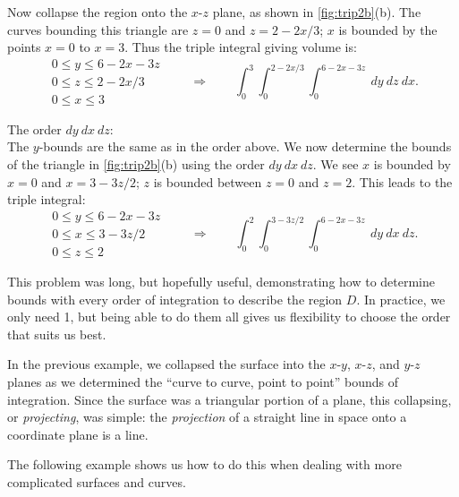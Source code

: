 {Now collapse the region onto the $x$-$z$ plane, as shown in \autoref{fig:trip2b}(b). The curves bounding this triangle are $z=0$ and $z=2-2x/3$; $x$ is bounded by the points $x=0$ to $x=3$. Thus the triple integral giving volume is: 
\[
 \begin{gathered}
  0\leq y\leq 6-2x-3z\\
  0\leq z\leq 2-2x/3\\
  0\leq x\leq 3
 \end{gathered}
 \qquad\Rightarrow\qquad
 \int_0^3\int_0^{2-2x/3}\int_0^{6-2x-3z}\ dy\ dz\ dx.
\]

\noindent The order $dy\ dx\ dz$:\\

The $y$-bounds are the same as in the order above. We now determine the bounds of the triangle in \autoref{fig:trip2b}(b) using the order $dy\ dx\ dz$. We see $x$ is bounded by $x=0$ and $x=3-3z/2$; $z$ is bounded between $z=0$ and $z=2$. This leads to the triple integral:
\[
 \begin{gathered}
  0\leq y\leq 6-2x-3z\\
  0\leq x\leq 3-3z/2\\
  0\leq z\leq 2
 \end{gathered}
 \qquad\Rightarrow\qquad
 \int_0^2\int_0^{3-3z/2}\int_0^{6-2x-3z}\ dy\ dx\ dz.
\]

This problem was long, but hopefully useful, demonstrating how to determine bounds with every order of integration to describe the region $D$. In practice, we only need 1, but being able to do them all gives us flexibility to choose the order that suits us best.}

In the previous example, we collapsed the surface into the $x$-$y$, $x$-$z$, and $y$-$z$ planes as we determined the ``curve to curve, point to point'' bounds of integration. Since the surface was a triangular portion of a plane, this collapsing, or \textit{projecting}, was simple: the \textit{projection} of a straight line in space onto a coordinate plane is a line.

The following example shows us how to do this when dealing with more complicated surfaces and curves.

